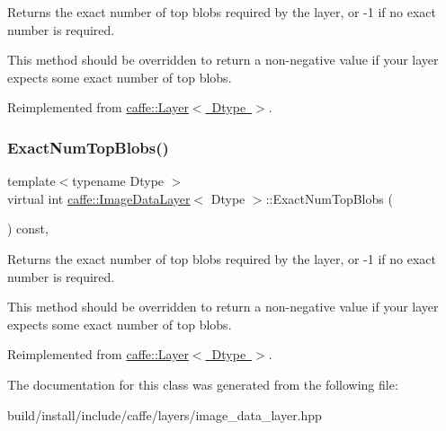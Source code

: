Returns the exact number of top blobs required by the layer, or -\/1 if no exact number is required. 

This method should be overridden to return a non-\/negative value if your layer expects some exact number of top blobs. 

Reimplemented from \mbox{\hyperlink{classcaffe_1_1_layer_a64e2ca72c719e4b2f1f9216ccfb0d37f}{caffe\+::\+Layer$<$ Dtype $>$}}.

\mbox{\label{classcaffe_1_1_image_data_layer_aa9182d46877b8514fca86e3588249567}} 
\subsubsection{\texorpdfstring{Exact\+Num\+Top\+Blobs()}{ExactNumTopBlobs()}\hspace{0.1cm}{\footnotesize\ttfamily [2/2]}}
{\footnotesize\ttfamily template$<$typename Dtype $>$ \\
virtual int \mbox{\hyperlink{classcaffe_1_1_image_data_layer}{caffe\+::\+Image\+Data\+Layer}}$<$ Dtype $>$\+::Exact\+Num\+Top\+Blobs (\begin{DoxyParamCaption}{ }\end{DoxyParamCaption}) const\hspace{0.3cm}{\ttfamily [inline]}, {\ttfamily [virtual]}}



Returns the exact number of top blobs required by the layer, or -\/1 if no exact number is required. 

This method should be overridden to return a non-\/negative value if your layer expects some exact number of top blobs. 

Reimplemented from \mbox{\hyperlink{classcaffe_1_1_layer_a64e2ca72c719e4b2f1f9216ccfb0d37f}{caffe\+::\+Layer$<$ Dtype $>$}}.



The documentation for this class was generated from the following file\+:\begin{DoxyCompactItemize}
\item 
build/install/include/caffe/layers/image\+\_\+data\+\_\+layer.\+hpp\end{DoxyCompactItemize}
